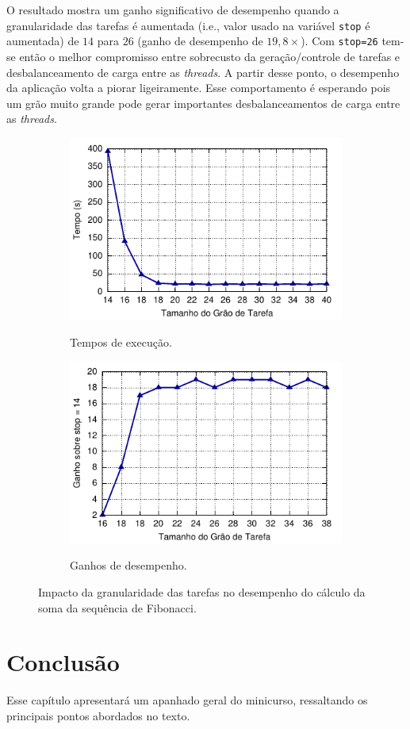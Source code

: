 \documentclass{SBCbookchapter}
\begin{document}
	O resultado mostra um ganho significativo de desempenho quando a granularidade das tarefas é aumentada (i.e.,
	valor usado na variável \texttt{stop} é aumentada) de $14$ para $26$ (ganho de desempenho de $19,8\times$).
	Com \texttt{stop=26} tem-se então o melhor compromisso entre sobrecusto da geração/controle de tarefas e
	desbalanceamento de carga entre as \textit{threads}. A partir desse ponto, o desempenho da aplicação volta a
	piorar ligeiramente. Esse comportamento é esperando pois um grão muito grande pode gerar importantes
	desbalanceamentos de carga entre as \textit{threads}.
	
		\begin{figure}[t]
			\captionsetup[subfigure]{justification=centering}
			\centering
				\begin{subfigure}{0.47\linewidth}
					\includegraphics[width=\linewidth]{img/fibonacci-task-grain}
					\label{fig:grao-tarefas-tempo}
					\caption{Tempos de execução.}
				\end{subfigure}
				\quad
				\begin{subfigure}{0.47\linewidth}
					\includegraphics[width=\linewidth]{img/fibonacci-speedup}
					\label{fig:grao-tarefas-ganho}
					\caption{Ganhos de desempenho.}
				\end{subfigure}
			\caption{Impacto da granularidade das tarefas no desempenho do cálculo da soma da sequência
				de Fibonacci.}
			\label{fig:grao-tarefas}
		\end{figure}


\section{Conclusão}
\label{sec:conclusao}

	Esse capítulo apresentará um apanhado geral do minicurso, ressaltando os
	principais pontos abordados no texto.


\end{document}
